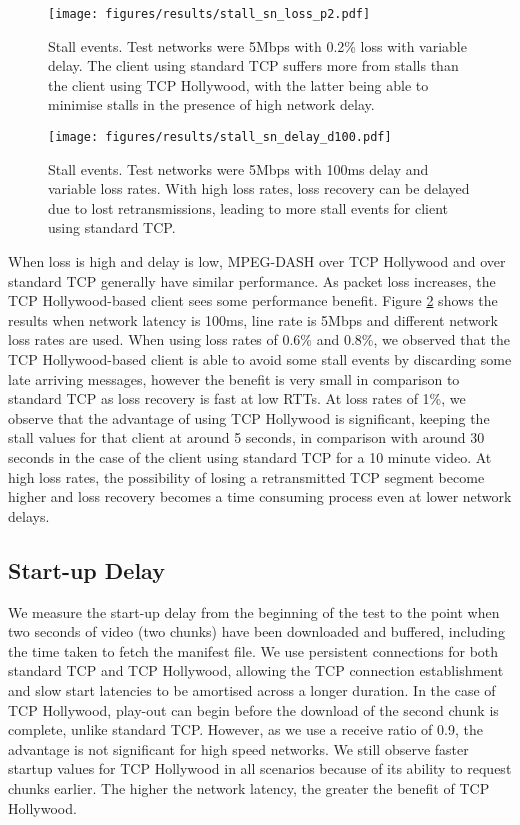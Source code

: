 \begin{figure}
  \centering
  \texttt{[image: figures/results/stall\_sn\_loss\_p2.pdf]}
  \caption{Stall events. Test networks were 5Mbps with 0.2\% loss with variable delay. The 
           client using standard TCP suffers more from stalls than the client using TCP Hollywood, 
           with the latter being able to minimise stalls in the presence of high network delay.}
  \label{fig:stall_delay2}
\end{figure}

\begin{figure}
  \centering
  \texttt{[image: figures/results/stall\_sn\_delay\_d100.pdf]}
  \caption{Stall events. Test networks were 5Mbps with 100ms delay and variable loss rates. With 
           high loss rates, loss recovery can be delayed due to lost retransmissions, leading 
           to more stall events for client using standard TCP.}
  \label{fig:stall_loss}
\end{figure}

When loss is high and delay is low, MPEG-DASH over TCP Hollywood and over standard TCP 
generally have similar performance. As packet loss increases, the TCP Hollywood-based 
client sees some performance benefit. Figure
\ref{fig:stall_loss} shows the results when network latency is 100ms, line rate is 5Mbps
and different network loss rates are used. When using loss rates of 0.6\% and 0.8\%, we
observed that the TCP Hollywood-based client is able to avoid some stall events by discarding 
some late arriving messages, however the benefit is very small in comparison to standard TCP 
as loss recovery is fast at low RTTs. At loss rates of 1\%, we observe that the advantage 
of using TCP Hollywood is significant, keeping the stall values for that client at around 5
seconds, in comparison with around 30 seconds in the case of the client using standard TCP 
for a 10 minute video. At high loss rates, the possibility of losing a retransmitted TCP 
segment become higher and loss recovery becomes a time consuming process even at lower 
network delays. 

\subsection{Start-up Delay}
We measure the start-up delay from the beginning of the test to the point when two seconds of
video (two chunks) have been downloaded and buffered, including the time taken to fetch the manifest
file. We use persistent connections for both standard TCP and TCP Hollywood, allowing the
TCP connection establishment and slow start latencies to be amortised across a longer
duration. In the case of TCP Hollywood, play-out can begin before the download of the
second chunk is complete, unlike standard TCP. However, as we use a receive ratio of 0.9,
the advantage is not significant for high speed networks. We still observe faster startup
values for TCP Hollywood in all scenarios because of its ability to request chunks
earlier. The higher the network latency, the greater the benefit of TCP Hollywood.

